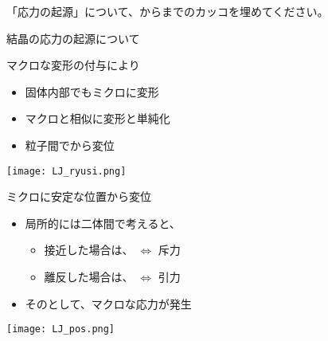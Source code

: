 \documentclass[uplatex,dvipdfmx,a4paper,11pt]{jsarticle}
\begin{document}
\begin{qlist}
	\qitem 「応力の起源」について、からまでのカッコを埋めてください。
		\begin{qlist2}
			\qitem 結晶の応力の起源について
				\begin{center}
					\begin{minipage}{0.42\textwidth}
						\begin{itembox}[l]{マクロな変形の付与により}
							\begin{itemize}
								\item 固体内部でもミクロに変形
								\item マクロと相似に変形と単純化
								\item 粒子間で\qbox{}から変位
							\end{itemize}
						\end{itembox}
						\begin{center}
							\texttt{[image: LJ\_ryusi.png]}
						\end{center}
					\end{minipage}
					\begin{minipage}{0.42\textwidth}
						\begin{itembox}[l]{ミクロに安定な位置から変位}
							\begin{itemize}
								\item 局所的には二体間で考えると、
								\begin{itemize}
									\item 接近した場合は、 $\Leftrightarrow$ 斥力
									\item 離反した場合は、 $\Leftrightarrow$ 引力
								\end{itemize}
								\item その\qbox{}として、マクロな応力が発生
							\end{itemize}
						\end{itembox}
						\begin{center}
							\texttt{[image: LJ\_pos.png]}
						\end{center}
					\end{minipage}
				\end{center}


\end{qlist2}
\end{qlist}
\end{document}
